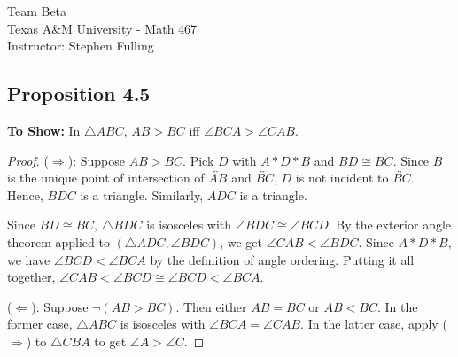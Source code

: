 \documentclass{article}
\newcommand{\geomline}{\overleftrightarrow}
\begin{document}
\noindent Team Beta\\
\noindent Texas A\&M University - Math 467\\ 
\noindent Instructor: Stephen Fulling

\subsection*{Proposition 4.5}
\noindent\textbf{To Show:} In $\triangle ABC$, $AB > BC$ iff $\angle BCA > \angle CAB$.
\begin{proof}
($\Rightarrow$): Suppose $AB > BC$. Pick $D$ with $A * D * B$ and $BD \cong BC$. 
Since $B$ is the unique point of intersection of $\geomline{AB}$ and $\geomline{BC}$, $D$ is not incident to $\geomline{BC}$. Hence, $BDC$ is a triangle. Similarly, $ADC$ is a triangle.

Since $BD \cong BC$, $\triangle BDC$ is isosceles with $\angle BDC \cong \angle BCD$.  By the exterior angle theorem applied to $(\triangle ADC, \angle BDC)$, we get $\angle CAB < \angle BDC$. Since $A * D * B$, we have $\angle BCD < \angle BCA$ by the definition of angle ordering. Putting it all together, $\angle CAB < \angle BCD \cong \angle BCD < \angle BCA$.

($\Leftarrow$): Suppose $\neg(AB > BC)$. Then either $AB = BC$ or $AB < BC$. In the former case, $\triangle ABC$ is isosceles with $\angle BCA = \angle CAB$.  In the latter case, apply ($\Rightarrow$) to $\triangle CBA$ to get $\angle A > \angle C$.
\end{proof}
\end{document}
